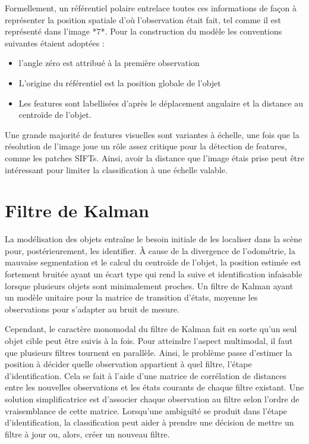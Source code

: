 Formellement, un référentiel polaire entrelace toutes ces informations
de façon à représenter la position spatiale d'où l'observation était
fait, tel comme il est représenté dans l'image *7*. Pour la
construction du modèle les conventions suivantes étaient adoptées :
\begin{itemize}
\item l'angle zéro est attribué à la première observation
\item L'origine du référentiel est la position globale de l’objet
\item Les features sont labellisées d'après le déplacement angulaire
et la distance au centroïde de l'objet.
\end{itemize}

Une grande majorité de features visuelles sont variantes à échelle, une
fois que la résolution de l’image joue un rôle assez critique pour la
détection de features, comme les patches SIFTs. Ainsi, avoir la distance
que l’image étais prise peut être intéressant pour limiter la
classification à une échelle valable.

\section{Filtre de Kalman }

La modélisation des objets entraîne le besoin initiale de les
localiser dans la scène pour, postérieurement, les identifier. À cause
de la divergence de l'odométrie, la mauvaise segmentation et le calcul
du centroïde de l'objet, la position estimée est fortement bruitée
ayant un écart type qui rend la suive et identification infaisable
lorsque plusieurs objets sont minimalement proches. Un filtre de
Kalman ayant un modèle unitaire pour la matrice de transition d'états,
moyenne les observations pour s'adapter au bruit de mesure.

Cependant, le caractère monomodal du filtre de Kalman fait en sorte
qu'un seul objet cible peut être suivis à la fois. Pour atteindre
l'aspect multimodal, il faut que plusieurs filtres tournent en
parallèle. Ainsi, le problème passe d’estimer la position à décider
quelle observation appartient à quel filtre, l'étape
d'identification. Cela se fait à l'aide d'une matrice de corrélation
de distances entre les nouvelles observations et les états courants de
chaque filtre existant. Une solution simplificatrice est d'associer
chaque observation au filtre selon l'ordre de vraisemblance de cette
matrice. Lorsqu’une ambiguïté se produit dans l'étape
d'identification, la classification peut aider à prendre une décision
de mettre un filtre à jour ou, alors, créer un nouveau filtre.

